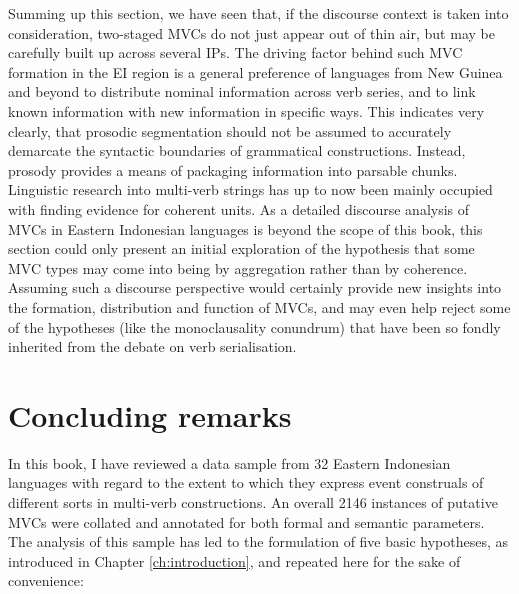 Summing up this section, we have seen that, if the discourse context is taken into consideration, two-staged MVCs do not just appear out of thin air, but may be carefully built up across several IPs. The driving factor behind such MVC formation in the EI region is a general preference of languages from New Guinea and beyond to distribute nominal information across verb series, and to link known information with new information in specific ways. This indicates very clearly, that prosodic segmentation should not be assumed to accurately demarcate the syntactic boundaries of grammatical constructions. Instead, prosody provides a means of packaging information into parsable chunks. Linguistic research into multi-verb strings has up to now been mainly occupied with finding evidence for coherent units. As a detailed discourse analysis of MVCs in Eastern Indonesian languages is beyond the scope of this book, this section could only present an initial exploration of the hypothesis that some MVC types may come into being by aggregation rather than by coherence. Assuming such a discourse perspective would certainly provide new insights into the formation, distribution and function of MVCs, and may even help reject some of the hypotheses (like the monoclausality conundrum) that have been so fondly inherited from the debate on verb serialisation.

\section{Concluding remarks} \label{sec:concluding}

In this book, I have reviewed a data sample from 32 Eastern Indonesian languages with regard to the extent to which they express event construals of different sorts in multi-verb constructions. An overall 2146 instances of putative MVCs were collated and annotated for both formal and semantic parameters. The analysis of this sample has led to the formulation of five basic hypotheses, as introduced in Chapter \ref{ch:introduction}, and repeated here for the sake of convenience:

